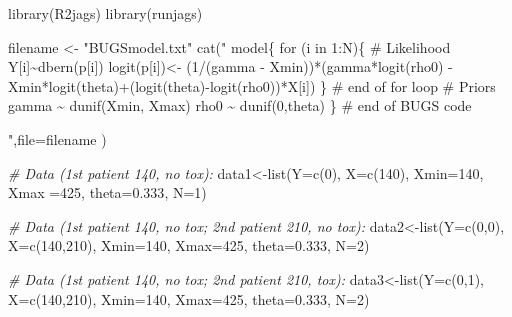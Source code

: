 \documentclass[
]{article}
\newenvironment{Shaded}{\begin{snugshade}}{\end{snugshade}}
\newcommand{\AttributeTok}[1]{\textcolor[rgb]{0.77,0.63,0.00}{#1}}
\newcommand{\CommentTok}[1]{\textcolor[rgb]{0.56,0.35,0.01}{\textit{#1}}}
\newcommand{\DecValTok}[1]{\textcolor[rgb]{0.00,0.00,0.81}{#1}}
\newcommand{\FloatTok}[1]{\textcolor[rgb]{0.00,0.00,0.81}{#1}}
\newcommand{\FunctionTok}[1]{\textcolor[rgb]{0.00,0.00,0.00}{#1}}
\newcommand{\NormalTok}[1]{#1}
\newcommand{\OtherTok}[1]{\textcolor[rgb]{0.56,0.35,0.01}{#1}}
\newcommand{\StringTok}[1]{\textcolor[rgb]{0.31,0.60,0.02}{#1}}
\begin{document}
\begin{Shaded}
\begin{Highlighting}[]
\FunctionTok{library}\NormalTok{(R2jags)}
\FunctionTok{library}\NormalTok{(runjags)}

\NormalTok{filename }\OtherTok{\textless{}{-}} \StringTok{"BUGSmodel.txt"}
\FunctionTok{cat}\NormalTok{(}\StringTok{"}
\StringTok{model\{}
\StringTok{    for (i in 1:N)\{}
\StringTok{\# Likelihood}
\StringTok{      Y[i]\textasciitilde{}dbern(p[i])}
\StringTok{      logit(p[i])\textless{}{-} (1/(gamma {-} Xmin))*(gamma*logit(rho0) }
\StringTok{      {-} Xmin*logit(theta)+(logit(theta){-}logit(rho0))*X[i])}
\StringTok{    \}  \#  end of for loop}
\StringTok{\# Priors}
\StringTok{    gamma \textasciitilde{} dunif(Xmin, Xmax)}
\StringTok{    rho0 \textasciitilde{} dunif(0,theta)}
\StringTok{  \}  \#  end of BUGS code}

\StringTok{"}\NormalTok{,}\AttributeTok{file=}\NormalTok{filename}
\NormalTok{)}

\CommentTok{\# Data (1st patient 140, no tox):}
\NormalTok{data1}\OtherTok{\textless{}{-}}\FunctionTok{list}\NormalTok{(}\AttributeTok{Y=}\FunctionTok{c}\NormalTok{(}\DecValTok{0}\NormalTok{), }\AttributeTok{X=}\FunctionTok{c}\NormalTok{(}\DecValTok{140}\NormalTok{), }\AttributeTok{Xmin=}\DecValTok{140}\NormalTok{, }\AttributeTok{Xmax =}\DecValTok{425}\NormalTok{, }\AttributeTok{theta=}\FloatTok{0.333}\NormalTok{, }\AttributeTok{N=}\DecValTok{1}\NormalTok{)}

\CommentTok{\# Data (1st patient 140, no tox; 2nd patient 210, no tox):}
\NormalTok{data2}\OtherTok{\textless{}{-}}\FunctionTok{list}\NormalTok{(}\AttributeTok{Y=}\FunctionTok{c}\NormalTok{(}\DecValTok{0}\NormalTok{,}\DecValTok{0}\NormalTok{), }\AttributeTok{X=}\FunctionTok{c}\NormalTok{(}\DecValTok{140}\NormalTok{,}\DecValTok{210}\NormalTok{), }\AttributeTok{Xmin=}\DecValTok{140}\NormalTok{, }\AttributeTok{Xmax=}\DecValTok{425}\NormalTok{, }\AttributeTok{theta=}\FloatTok{0.333}\NormalTok{, }\AttributeTok{N=}\DecValTok{2}\NormalTok{)   }
    
\CommentTok{\# Data (1st patient 140, no tox; 2nd patient 210, tox):}
\NormalTok{data3}\OtherTok{\textless{}{-}}\FunctionTok{list}\NormalTok{(}\AttributeTok{Y=}\FunctionTok{c}\NormalTok{(}\DecValTok{0}\NormalTok{,}\DecValTok{1}\NormalTok{), }\AttributeTok{X=}\FunctionTok{c}\NormalTok{(}\DecValTok{140}\NormalTok{,}\DecValTok{210}\NormalTok{), }\AttributeTok{Xmin=}\DecValTok{140}\NormalTok{, }\AttributeTok{Xmax=}\DecValTok{425}\NormalTok{, }\AttributeTok{theta=}\FloatTok{0.333}\NormalTok{, }\AttributeTok{N=}\DecValTok{2}\NormalTok{)   }
    

\end{Highlighting}
\end{Shaded}
\end{document}
